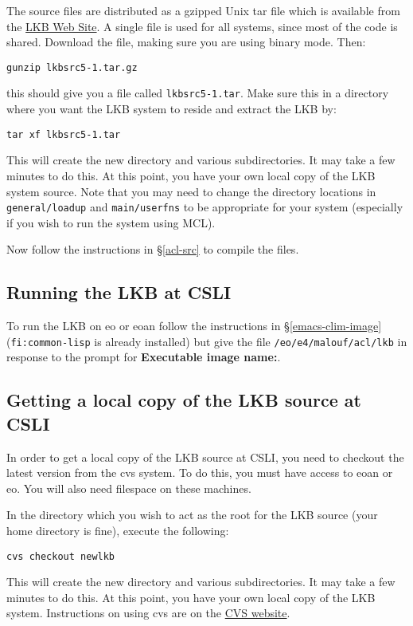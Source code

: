 \documentclass[12pt]{report}
\newcommand{\filename}[1]{{\tt #1}}
\newcommand{\functionname}[1]{{\tt #1}}
\begin{document}
The source files are distributed as a 
gzipped Unix tar file which is available from the
\href{http://www-csli.stanford.edu/~aac/lkb.html}{LKB Web Site}.
A single file is used for all systems, since most of the code is shared.
Download the file, making sure you are using binary mode.
Then:
\begin{verbatim}
gunzip lkbsrc5-1.tar.gz
\end{verbatim}
this should give you a file called \filename{lkbsrc5-1.tar}.  
Make sure this in a directory where you want the LKB system to reside
and extract the LKB by:
\begin{verbatim}
tar xf lkbsrc5-1.tar
\end{verbatim}
This will create the new directory and various subdirectories.
It may take a few minutes to do this.  At this point, you have 
your own local copy of the LKB system source.  Note that
you may need to change the directory locations in \filename{general/loadup}
and \filename{main/userfns}
to be appropriate for your system
(especially if you wish to run the system using MCL).

Now follow the instructions in \S\ref{acl-src} to compile the
files.

\subsection{Running the LKB at CSLI}
\label{run-csli}

To run the LKB on eo or eoan
follow the instructions in \S\ref{emacs-clim-image} 
(\functionname{fi:common-lisp} is already installed)
but give the file \filename{/eo/e4/malouf/acl/lkb} in response
to the prompt for {\bf Executable image name:}.

\subsection{Getting a local copy of the LKB source at CSLI}
\label{down-csli}

In order to get a local copy of the LKB source at CSLI, you need to
checkout the latest version from the cvs system.  To do this,
you must have access to eoan or eo.  You will also need filespace
on these machines.

In the directory which you wish to act as the root for the LKB source
(your home directory is fine), execute the following:
\begin{verbatim}
cvs checkout newlkb
\end{verbatim}
This will create the new directory and various subdirectories.
It may take a few minutes to do this.  At this point, you have 
your own local copy of the LKB system.  Instructions on using
cvs are on the
\href{http://www.loria.fr/~molli/cvs/doc/cvs_toc.html}{CVS website}. 
\end{document}
